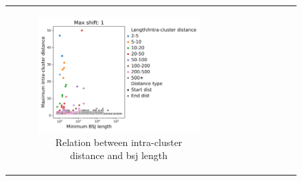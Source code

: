 \begin{figure}[ht] \begin{tabular}{cc} \begin{subfigure}{0.5\textwidth}
                                           \centering

                                           \includegraphics[width=\linewidth]{chapters/4_results_and_discussion/figures/detection/distances/diff_1_scatter.png}
                                           \caption{Relation between
                                               intra-cluster distance and
                                               \gls{bsj} length}
                                           \label{fig:clustering_scatter}
                                       \end{subfigure} &
               \begin{subfigure}{0.5\textwidth} \centering


\end{subfigure}
\end{tabular}
\end{figure}
